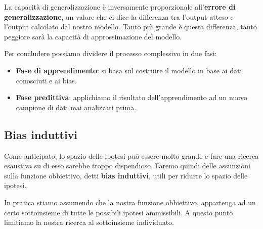 La capacit\`a di generalizzazione \`e inversamente proporzionale all'\textbf{errore di generalizzazione}, un valore che ci
dice la differenza tra l'output atteso e l'output calcolato dal nostro modello. Tanto pi\`u grande \`e questa differenza,
tanto peggiore sar\`a la capacit\`a di approssimazione del modello.

Per concludere possiamo dividere il processo complessivo in due fasi:
\begin{itemize}
	\item \textbf{Fase di apprendimento}: si basa sul costruire il modello in base ai dati conosciuti e ai bias.
	\item \textbf{Fase predittiva}: applichiamo il risultato dell'apprendimento ad un nuovo campione di dati mai analizzati
	      prima.
\end{itemize}

\subsection{Bias induttivi}
Come anticipato, lo spazio delle ipotesi pu\`o essere molto grande e fare una ricerca esaustiva su di esso sarebbe troppo
dispendioso. Faremo quindi delle assunzioni sulla funzione obbiettivo, detti \textbf{bias induttivi}, utili per ridurre lo
spazio delle ipotesi.

In pratica stiamo assumendo che la nostra funzione obbiettivo, appartenga ad un certo sottoinsieme di tutte le possibili
ipotesi ammissibili. A questo punto limitiamo la nostra ricerca al sottoinsieme individuato.